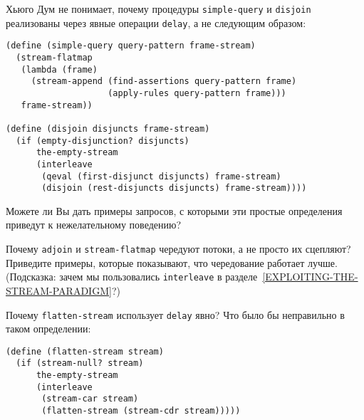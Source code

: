 \begin{exercise}{4.71}%
\label{EX4.71}%
Хьюго Дум не понимает, почему процедуры
{\tt simple-query} и {\tt disjoin} реализованы через
явные операции {\tt delay}, а не следующим образом:

\begin{Verbatim}[fontsize=\small]
(define (simple-query query-pattern frame-stream)
  (stream-flatmap
   (lambda (frame)
     (stream-append (find-assertions query-pattern frame)
                    (apply-rules query-pattern frame)))
   frame-stream))

(define (disjoin disjuncts frame-stream)
  (if (empty-disjunction? disjuncts)
      the-empty-stream
      (interleave
       (qeval (first-disjunct disjuncts) frame-stream)
       (disjoin (rest-disjuncts disjuncts) frame-stream))))
\end{Verbatim}
Можете ли Вы дать примеры запросов, с которыми эти простые определения
приведут к нежелательному поведению?
\end{exercise}

\begin{exercise}{4.72}%
\label{EX4.72}%
Почему {\tt adjoin} и {\tt stream-flatmap}
чередуют потоки, а не просто их сцепляют?  Приведите примеры, которые
показывают, что чередование работает лучше.  (Подсказка: зачем мы
пользовались {\tt interleave} в 
разделе~\ref{EXPLOITING-THE-STREAM-PARADIGM}?)
\end{exercise}

\begin{exercise}{4.73}%
\label{EX4.73}%
Почему {\tt flatten-stream} использует
{\tt delay} явно?  Что было бы неправильно в таком определении:

\begin{Verbatim}[fontsize=\small]
(define (flatten-stream stream)
  (if (stream-null? stream)
      the-empty-stream
      (interleave
       (stream-car stream)
       (flatten-stream (stream-cdr stream)))))
\end{Verbatim}
\end{exercise}

